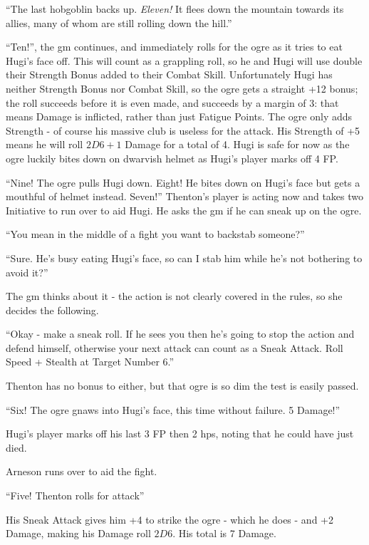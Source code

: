 \begin{multicols}{2}
{\begin{exampletext}
		``The last hobgoblin backs up. \textit{Eleven!} It flees down the mountain towards its allies, many of whom are still rolling down the hill.''

		``Ten!'', the \gls{gm} continues, and immediately rolls for the ogre as it tries to eat Hugi's face off. This will count as a grappling roll, so he and Hugi will use double their Strength Bonus added to their Combat Skill. Unfortunately Hugi has neither Strength Bonus nor Combat Skill, so the ogre gets a straight +12 bonus; the roll succeeds before it is even made, and succeeds by a margin of 3: that means Damage is inflicted, rather than just Fatigue Points. The ogre only adds Strength - of course his massive club is useless for the attack. His Strength of +5 means he will roll $2D6+1$ Damage for a total of 4. Hugi is safe for now as the ogre luckily bites down on dwarvish helmet as Hugi's player marks off 4 FP.

		``Nine! The ogre pulls Hugi down. Eight! He bites down on Hugi's face but gets a mouthful of helmet instead. Seven!''
		Thenton's player is acting now and takes two Initiative to run over to aid Hugi. He asks the \gls{gm} if he can sneak up on the ogre.

		``You mean in the middle of a fight you want to backstab someone?''

		``Sure. He's busy eating Hugi's face, so can I stab him while he's not bothering to avoid it?''

		The \gls{gm} thinks about it - the action is not clearly covered in the rules, so she decides the following.

		``Okay - make a sneak roll. If he sees you then he's going to stop the action and defend himself, otherwise your next attack can count as a Sneak Attack. Roll Speed + Stealth at Target Number 6.''

		Thenton has no bonus to either, but that ogre is so dim the test is easily passed. 

		``Six! The ogre gnaws into Hugi's face, this time without failure. 5 Damage!''

		Hugi's player marks off his last 3 FP then 2 \glspl{hp}, noting that he could have just died.

		Arneson runs over to aid the fight.

``Five! Thenton rolls for attack''

His Sneak Attack gives him +4 to strike the ogre - which he does - and +2 Damage, making his Damage roll $2D6$. His total is 7 Damage.


\end{exampletext}}
\end{multicols}
